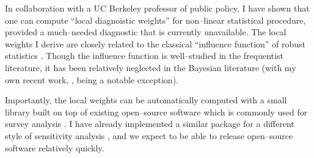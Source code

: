 In collaboration with a UC Berkeley professor of public policy, I have shown
that one can compute ``local diagnoistic weights'' for non--linear statistical
procedure, provided a much--needed diagnostic that is currently unavailable. The
local weights I derive are closely related to the classical ``influence
function'' of robust statistics
\citep{mises:1947:asymptotic,hampel:1986:robust,giordano:2019:swiss}.  Though
the influence function is well--studied in the frequentist literature, it has
been relatively neglected in the Bayesian literature (with my own recent work,
\citet{giordano:2023:bayesij}, being a notable exception).

Importantly, the local weights can be automatically computed with a small
library built on top of existing open--source software which is commonly used
for survey analysis \citep{lopezmartin:2022:mrptutorial}.  I have already
implemented a similar package for a different style of sensitivity analysis
\citep{giordano:2020:amip,giordano:2024:zaminfluence}, and we expect to be able
to release open--source software relatively quickly.  







